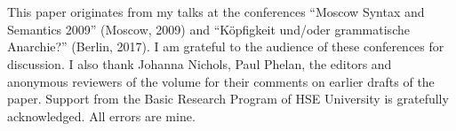 \documentclass[output=paper
  ,nobabel
  ,draftmode
  ,colorlinks, citecolor=brown
]{langscibook}
\begin{document}
\section*{\acknowledgmentsUS}

This paper originates from my talks at the conferences ``Moscow Syntax and Semantics 2009'' (Moscow, 2009) and ``Köpfigkeit und/oder grammatische Anarchie?'' (Berlin, 2017). I am grateful to the audience of these conferences for discussion. I also thank Johanna Nichols, Paul Phelan, the editors and anonymous reviewers of the volume for their comments on earlier drafts of the paper. Support from the Basic Research Program of HSE University is gratefully acknowledged. All errors are mine.

{\sloppy
\printbibliography[heading=subbibliography,notkeyword=this]
}
\end{document}
